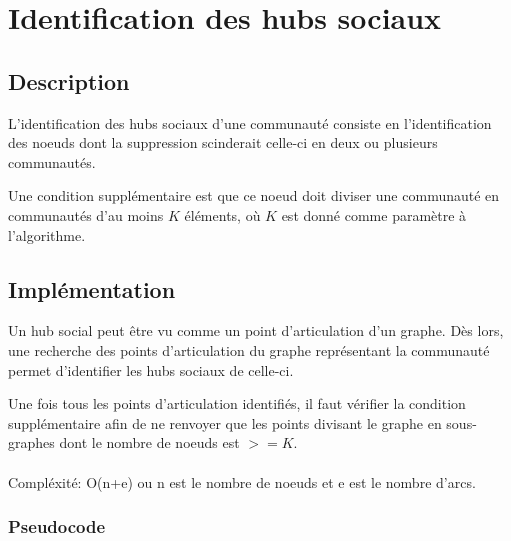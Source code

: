 \documentclass[12pt, oneside]{article}
\begin{document}
\FloatBarrier
\section{Identification des hubs sociaux}
\subsection{Description}
L'identification des hubs sociaux d'une communauté consiste en l'identification des noeuds dont la suppression scinderait celle-ci en deux ou plusieurs communautés.

Une condition supplémentaire est que ce noeud doit diviser une communauté en communautés d'au moins $K$ éléments, où $K$ est donné comme paramètre à l'algorithme.

\subsection{Implémentation}

Un hub social peut être vu comme un point d'articulation d'un graphe. 
Dès lors, une recherche des points d'articulation du graphe représentant la communauté permet d'identifier les hubs sociaux de celle-ci.

Une fois tous les points d'articulation identifiés, il faut vérifier la condition supplémentaire afin de ne renvoyer que les points divisant le graphe en sous-graphes dont le nombre de noeuds est $>=K$.\\\\
Compléxité: O(n+e) ou n est le nombre de noeuds et e est le nombre d'arcs.
\newpage
\subsubsection{Pseudocode}
\begin{algorithm}[H]
\end{algorithm}
\newpage
\FloatBarrier
\end{document}
